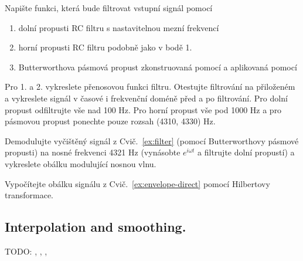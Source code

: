 \begin{exercise}
    \label{ex:filter}
    Napište funkci, která bude filtrovat vstupní signál pomocí
    \begin{enumerate}
        \item dolní propusti RC filtru s nastavitelnou mezní frekvencí
        \item horní propusti RC filtru podobně jako v bodě 1.
        \item Butterworthova pásmová propust zkonstruovaná pomocí  a aplikovaná pomocí 
    \end{enumerate}

    Pro 1. a 2. vykreslete přenosovou funkci filtru. Otestujte filtrování na přiloženém  a vykreslete signál v časové i frekvenční doméně před a po filtrování. Pro dolní propust odfiltrujte vše nad 100 Hz. Pro horní propust vše pod 1000 Hz a pro pásmovou propust ponechte pouze rozsah (4310, 4330) Hz.
\end{exercise}


\begin{exercise}
    \label{ex:envelope-direct}
    Demodulujte vyčištěný signál z Cvič.~\ref{ex:filter} (pomocí Butterworthovy pásmové propusti) na nosné frekvenci 4321 Hz (vynásobte $e^{i\omega t}$ a filtrujte dolní propustí) a vykreslete obálku modulující nosnou vlnu.
\end{exercise}

\begin{exercise}
    \label{ex:envelope-hilbert}
    Vypočítejte obálku signálu z Cvič.~\ref{ex:envelope-direct} pomocí Hilbertovy transformace.
\end{exercise}

\subsection{Interpolation and smoothing.}

TODO: , , , 